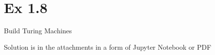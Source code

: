 \section*{Ex 1.8}
\begin{mdframed}
	Build Turing Machines
\end{mdframed}

Solution is in the attachments in a form of Jupyter Notebook or PDF